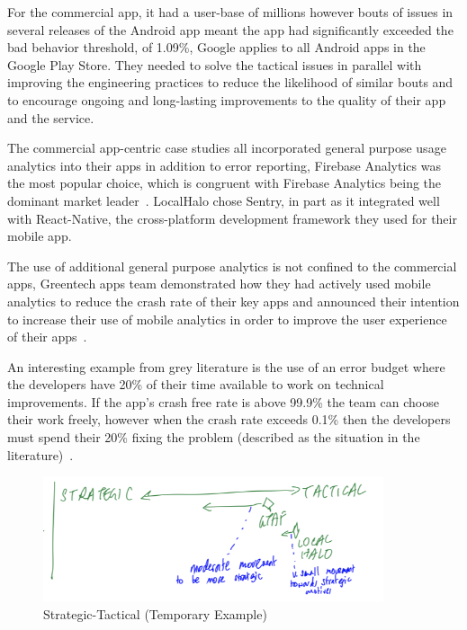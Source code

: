 For the commercial app, it had a user-base of millions however bouts of issues in several releases of the Android app meant the app had significantly exceeded the bad behavior threshold, of 1.09\%, Google applies to all Android apps in the Google Play Store. They needed to solve the tactical issues in parallel with improving the engineering practices to reduce the likelihood of similar bouts and to encourage ongoing and long-lasting improvements to the quality of their app and the service. 

The commercial app-centric case studies all incorporated general purpose usage analytics into their apps in addition to error reporting, Firebase Analytics was the most popular choice, which is congruent with Firebase Analytics being the dominant market leader~\citep{appbrain_firebase}. LocalHalo chose Sentry, in part as it integrated well with React-Native, the cross-platform development framework they used for their mobile app.

The use of additional general purpose analytics is not confined to the commercial apps, Greentech apps team demonstrated how they had actively used mobile analytics to reduce the crash rate of their key apps and announced their intention to increase their use of mobile analytics in order to improve the user experience of their apps~\citep{gtafblog2021_gtaf_accomplishment_2020}. 

An interesting example from grey literature is the use of an error budget where the developers have 20\% of their time available to work on technical improvements. If the app's crash free rate is above 99.9\% the team can choose their work freely, however when the crash rate exceeds 0.1\% then the developers must spend their 20\% fixing the problem (described as the situation in the literature)~\citep{koutun2021_how_to_deal_with_tech_debt_at_the_scale_of_super_app}.

\begin{figure}
    \centering
    \includegraphics[width=10cm]{images/rough-sketches/aiu-strategic-tactical-example.png}
    \caption{Strategic-Tactical (Temporary Example)}
    \label{fig:aiu-strategic-tactical-example}
\end{figure}



